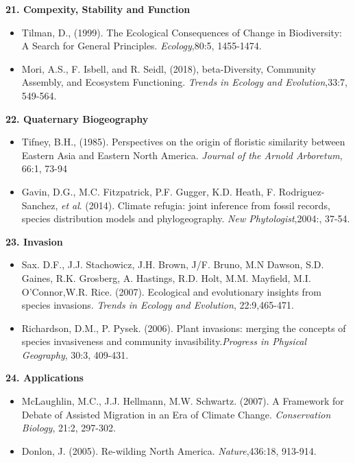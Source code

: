 \documentclass{article}
\begin{document}
\hline
\textbf{21. Compexity, Stability and Function}
\begin{itemize}
\item Tilman, D., (1999). The Ecological Consequences of Change in Biodiversity: A Search for General Principles. \textit{Ecology},80:5, 1455-1474.
\item Mori, A.S., F. Isbell, and R. Seidl, (2018), beta-Diversity, Community Assembly, and Ecosystem Functioning. \textit{Trends in Ecology and Evolution},33:7, 549-564.
\end{itemize}
\hline
\textbf{22. Quaternary Biogeography}
\begin{itemize}
\item Tifney, B.H., (1985). Perspectives on the origin of floristic similarity between Eastern Asia and Eastern North America. \textit{Journal of the Arnold Arboretum}, 66:1, 73-94
\item Gavin, D.G., M.C. Fitzpatrick, P.F. Gugger, K.D. Heath, F. Rodriguez-Sanchez, \textit{et al}. (2014). Climate refugia: joint inference from fossil records, species distribution models and phylogeography. \textit{New Phytologist},2004:, 37-54.
\end{itemize}
\hline
\textbf{23. Invasion}
\begin{itemize}
\item Sax. D.F., J.J. Stachowicz, J.H. Brown, J/F. Bruno,
M.N Dawson, S.D. Gaines, R.K. Grosberg, A. Hastings, R.D. Holt, M.M. Mayfield, M.I. O’Connor,W.R. Rice. (2007). Ecological and evolutionary insights from species invasions. \textit{Trends in Ecology and Evolution}, 22:9,465-471.
\item Richardson, D.M., P. Pysek. (2006). Plant invasions: merging the concepts of species invasiveness and community invasibility.\textit{Progress in Physical Geography}, 30:3, 409-431.
\end{itemize} 
\hline
\textbf{24. Applications}
\begin{itemize}
\item McLaughlin, M.C., J.J. Hellmann, M.W. Schwartz. (2007). A Framework for Debate of Assisted Migration in an Era of Climate Change. \textit{Conservation Biology}, 21:2, 297-302.
\item Donlon, J. (2005). Re-wilding North America. \textit{Nature},436:18, 913-914.
\end{itemize} 
\hline
\end{document}
